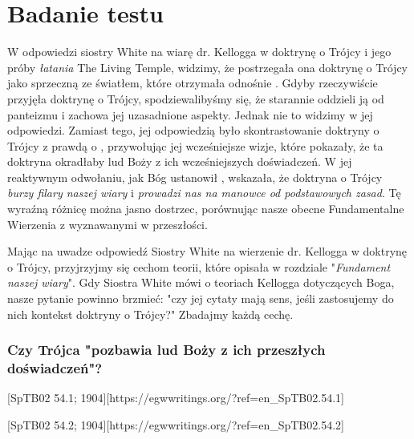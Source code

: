 
\chapter{Badanie testu}

W odpowiedzi siostry White na wiarę dr. Kellogga w doktrynę o Trójcy i jego próby \textit{łatania} The Living Temple, widzimy, że postrzegała ona doktrynę o Trójcy jako sprzeczną ze światłem, które otrzymała odnośnie . Gdyby rzeczywiście przyjęła doktrynę o Trójcy, spodziewalibyśmy się, że starannie oddzieli ją od panteizmu i zachowa jej uzasadnione aspekty. Jednak nie to widzimy w jej odpowiedzi. Zamiast tego, jej odpowiedzią było skontrastowanie doktryny o Trójcy z prawdą o , przywołując jej wcześniejsze wizje, które pokazały, że ta doktryna okradłaby lud Boży z ich wcześniejszych doświadczeń. W jej reaktywnym odwołaniu, jak Bóg ustanowił , wskazała, że doktryna o Trójcy \textit{burzy filary naszej wiary} i \textit{prowadzi nas na manowce od podstawowych zasad}. Tę wyraźną różnicę można jasno dostrzec, porównując nasze obecne Fundamentalne Wierzenia z  wyznawanymi w przeszłości.

Mając na uwadze odpowiedź Siostry White na wierzenie dr. Kellogga w doktrynę o Trójcy, przyjrzyjmy się cechom teorii, które opisała w rozdziale "\textit{Fundament naszej wiary}". Gdy Siostra White mówi o teoriach Kellogga dotyczących Boga, nasze pytanie powinno brzmieć: "czy jej cytaty mają sens, jeśli zastosujemy do nich kontekst doktryny o Trójcy?" Zbadajmy każdą cechę.

\subsection*{Czy Trójca "pozbawia lud Boży z ich przeszłych doświadczeń"?}

[SpTB02 54.1; 1904][https://egwwritings.org/?ref=en\_SpTB02.54.1]

[SpTB02 54.2; 1904][https://egwwritings.org/?ref=en\_SpTB02.54.2]

